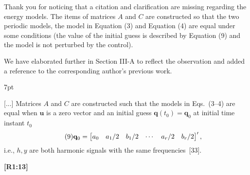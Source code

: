\documentclass[10pt]{letter}
\newenvironment{formal}{%
  \def\FrameCommand{%
    \hspace{1pt}%
    {\color{red}\vrule width 2pt}%
    {\color{formalshade}\vrule width 4pt}%
    \colorbox{formalshade}%
  }%
  \MakeFramed{\advance\hsize-\width\FrameRestore}%
  \noindent\hspace{-4.55pt}%
  \begin{adjustwidth}{}{7pt}%
  \vspace{2pt}\vspace{2pt}%
}
{%
  \vspace{2pt}\end{adjustwidth}\endMakeFramed%
}
\begin{document}
{\color{blue} 

{\hspace*{-4.5em}{[R1:12]}\vspace*{-1.9em}}

Thank you for noticing that a citation and clarification are missing regarding the energy models. The items of matrices $A$ and $C$ are constructed so that the two periodic models, the model in Equation ({\color{red}3}) and Equation ({\color{red}4}) are equal under some conditions (the value of the initial guess is described by Equation ({\color{red}9}) and the model is not perturbed by the control).

We have elaborated further in Section III-A to reflect the observation and added a reference to the corresponding author's previous work.

\begin{formal}
  {\color{black}
  [...] {\color{blue}Matrices $A$ and $C$ are constructed such that t}he %
  models in Eqs.~({\color{red}3}--{\color{red}4}) {\color{black}are equal when $\mathbf{u}$ is a {\color{black}zero vector %
  and an initial guess $\mathbf{q}(t_0)=\mathbf{q}_0$ at initial time instant $t_0$}}
    {\color{blue}\begin{equation}\tag{9}
    {\color{black}\mathbf{q}_0=\begin{bmatrix}a_0 & a_1/2 & b_1/2 & \cdots & a_r/2 & b_r/2\end{bmatrix}',}
    \end{equation}}
  \color{black}i.e., $h,y$ are both harmonic signals with the same frequencies{\color{blue}~[{\color{green}33}]}.}
  \vspace*{1ex}
\end{formal}
}

{\hspace*{-4.5em}\textbf{[R1:13]}\vspace*{-1.9em}}
\end{document}
